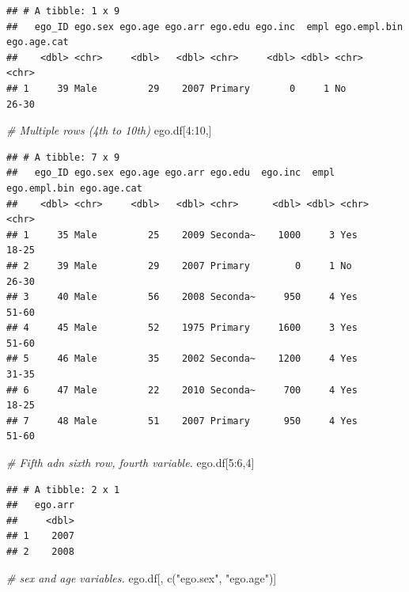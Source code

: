 \documentclass[
]{book}
\newenvironment{Shaded}{\begin{snugshade}}{\end{snugshade}}
\newcommand{\CommentTok}[1]{\textcolor[rgb]{0.56,0.35,0.01}{\textit{#1}}}
\newcommand{\DecValTok}[1]{\textcolor[rgb]{0.00,0.00,0.81}{#1}}
\newcommand{\FunctionTok}[1]{\textcolor[rgb]{0.00,0.00,0.00}{#1}}
\newcommand{\NormalTok}[1]{#1}
\newcommand{\SpecialCharTok}[1]{\textcolor[rgb]{0.00,0.00,0.00}{#1}}
\newcommand{\StringTok}[1]{\textcolor[rgb]{0.31,0.60,0.02}{#1}}
\begin{document}
\begin{verbatim}
## # A tibble: 1 x 9
##   ego_ID ego.sex ego.age ego.arr ego.edu ego.inc  empl ego.empl.bin ego.age.cat
##    <dbl> <chr>     <dbl>   <dbl> <chr>     <dbl> <dbl> <chr>        <chr>      
## 1     39 Male         29    2007 Primary       0     1 No           26-30
\end{verbatim}

\begin{Shaded}
\begin{Highlighting}[]
\CommentTok{\# Multiple rows (4th to 10th)}
\NormalTok{ego.df[}\DecValTok{4}\SpecialCharTok{:}\DecValTok{10}\NormalTok{,]}
\end{Highlighting}
\end{Shaded}

\begin{verbatim}
## # A tibble: 7 x 9
##   ego_ID ego.sex ego.age ego.arr ego.edu  ego.inc  empl ego.empl.bin ego.age.cat
##    <dbl> <chr>     <dbl>   <dbl> <chr>      <dbl> <dbl> <chr>        <chr>      
## 1     35 Male         25    2009 Seconda~    1000     3 Yes          18-25      
## 2     39 Male         29    2007 Primary        0     1 No           26-30      
## 3     40 Male         56    2008 Seconda~     950     4 Yes          51-60      
## 4     45 Male         52    1975 Primary     1600     3 Yes          51-60      
## 5     46 Male         35    2002 Seconda~    1200     4 Yes          31-35      
## 6     47 Male         22    2010 Seconda~     700     4 Yes          18-25      
## 7     48 Male         51    2007 Primary      950     4 Yes          51-60
\end{verbatim}

\begin{Shaded}
\begin{Highlighting}[]
\CommentTok{\# Fifth adn sixth row, fourth variable.}
\NormalTok{ego.df[}\DecValTok{5}\SpecialCharTok{:}\DecValTok{6}\NormalTok{,}\DecValTok{4}\NormalTok{]}
\end{Highlighting}
\end{Shaded}

\begin{verbatim}
## # A tibble: 2 x 1
##   ego.arr
##     <dbl>
## 1    2007
## 2    2008
\end{verbatim}

\begin{Shaded}
\begin{Highlighting}[]
\CommentTok{\# sex and age variables.}
\NormalTok{ego.df[, }\FunctionTok{c}\NormalTok{(}\StringTok{"ego.sex"}\NormalTok{, }\StringTok{"ego.age"}\NormalTok{)]}
\end{Highlighting}
\end{Shaded}
\end{document}
